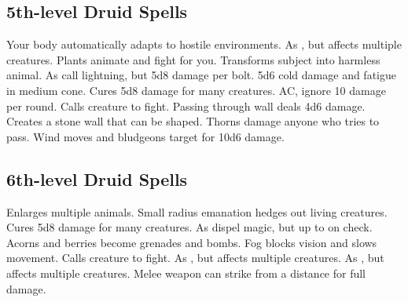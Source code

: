 \subsection{5th-level Druid Spells}
\begin{spelllist}
   Your body automatically adapts to hostile environments.
   As , but affects multiple creatures.
   Plants animate and fight for you.
   Transforms subject into harmless animal.
   As call lightning, but 5d8 damage per bolt.
   5d6 cold damage and fatigue in medium cone.
   Cures 5d8 damage for many creatures.
    AC, ignore 10 damage per round.
   Calls creature to fight.
   Passing through wall deals 4d6 damage.
   Creates a stone wall that can be shaped.
   Thorns damage anyone who tries to pass.
   Wind moves and bludgeons target for 10d6 damage.
\end{spelllist}

\subsection{6th-level Druid Spells}
\begin{spelllist}
   Enlarges multiple animals.
   Small radius emanation hedges out living creatures.
   Cures 5d8 damage for many creatures.
   As dispel magic, but up to  on check.
   Acorns and berries become grenades and bombs.
   Fog blocks vision and slows movement.
   Calls creature to fight.
   As , but affects multiple creatures.
   As , but affects multiple creatures.
   Melee weapon can strike from a distance for full damage.
\end{spelllist}

